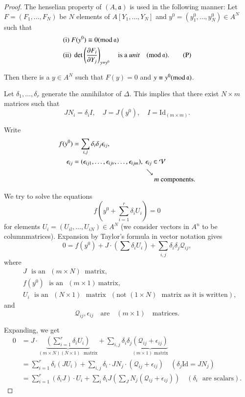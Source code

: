 \begin{proof}
The henselian property of $(A,\mathfrak{a})$ is used in the following
manner: Let $F=(F_{1},\ldots,F_{N})$ be $N$ elements of
$A[Y_{1},\ldots,Y_{N}]$ and $y^{0}=(y^{0}_{1},\ldots,y^{0}_{N})\in
A^{N}$ such that
\begin{align*}
& {\rm(i)~~ } F(y^{0})\equiv 0(\text{mod\,}\mathfrak{a})\\
& {\rm(ii)~ } \det \left(\frac{\partial F_{i}}{\partial Y_{j}}\right)_{y=y^0}\quad\text{is
    a {\em unit}}\quad (\text{mod\,}\mathfrak{a}).\tag{P}
\end{align*}

Then there is a $y\in A^{N}$ such that $F(y)=0$ and $y\equiv
y^{0}(\text{mod\,}\mathfrak{a})$. 

Let $\delta_{1},\ldots,\delta_{r}$ generate the annihilator of
$\Delta$. This implies that there exist $N\times m$ matrices such that
$$
JN_{i}=\delta_{i}I,\quad J=J(y^{0}),\quad I=\text{Id}_{(m\times m)}.
$$

Write
\begin{align*}
f(y^{0}) &= \sum_{i,j}\delta_{i}\delta_{j}\epsilon_{ij},\\
\epsilon_{ij} &=
(\epsilon_{ij1},\ldots,\epsilon_{ij\nu},\ldots,\epsilon_{ijm}),\ \epsilon_{ij}\in\mathcal{V}\\
&\hspace{3.7cm}\searrow\\[-4pt]
&\hspace{4.2cm}m \text{~ components.}
\end{align*}

We try to solve the equations
$$
f\left(y^{0}+\sum^{r}_{i=1}\delta_{i}U_{i}\right)=0
$$
for elements $U_{i}=(U_{il},\ldots,U_{iN})\in A^{N}$ (we consider
vectors in $A^{n}$ to be column\pageoriginale matrices). Expansion by
Taylor's formula in vector notation gives
$$
0=f(y^{0})+J\cdot (\sum
\delta_{i}U_{i})+\sum_{i,j}\delta_{i}\delta_{j}\mathcal{Q}_{ij}, 
$$
where
\begin{align*}
& J\text{~ is an~ }(m\times N)\ \text{ matrix},\\
& f(y^{0})\text{~ is an~ }(m\times 1)\ \text{matrix,}\\
& U_{i}\text{~ is an~ } (N\times 1) \text{~ matrix~ }(\text{not~}
  (1\times N)\text{~ matrix as it is written}),
\end{align*}
and
$$
\mathcal{Q}_{ij},\epsilon_{ij}\quad\text{are}\quad (m\times
1)\quad\text{matrices.} 
$$

Expanding, we get
\begin{align*}
 0 &=J\cdot
  \underbrace{(\sum\limits^{r}_{i=1}\delta_{i}U_{i})}_{(m\times
    N)(N\times 1)\text{~ matrix}} +
  \sum_{i,j}\delta_{i}\delta_{j}\underbrace{(\mathcal{Q}_{ij}+\epsilon_{ij})}_{(m\times
    1)\text{~matrix}}\\
&= \sum^{r}_{i=1}\delta_{i}(JU_{i})+\sum_{i,j}\delta_{i}\cdot
  JN_{j}\cdot (\mathcal{Q}_{ij}+\epsilon_{ij})\quad
  (\delta_{j}\text{Id}=JN_{j})\\ 
&= \sum^{r}_{i=1}(\delta_{i}J)\cdot
  U_{i}+\sum_{i}\delta_{i}J(\sum_{J}N_{j}(\mathcal{Q}_{ij}+\epsilon_{ij}))\quad
  (\delta_{i}\text{~ are scalars}).  
\end{align*}


\end{proof}
